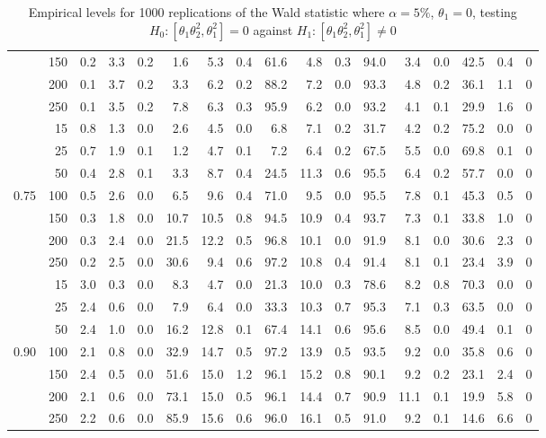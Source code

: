 \documentclass[]{article}\usepackage[]{graphicx}\usepackage[]{color}
\begin{document}
\begin{table}[H]
{\begin{tabular}{|r|r|r|r|r|r|r|r|r|r|r|r|r|r|r|r|r|}
			& 150 & 0.2 & 3.3 & 0.2 & 1.6 & 5.3 & 0.4 & 61.6 & 4.8 & 0.3 & 94.0 & 3.4 & 0.0 & 42.5 & 0.4 & 0 \\
			& 200 & 0.1 & 3.7 & 0.2 & 3.3 & 6.2 & 0.2 & 88.2 & 7.2 & 0.0 & 93.3 & 4.8 & 0.2 & 36.1 & 1.1 & 0 \\
			& 250 & 0.1 & 3.5 & 0.2 & 7.8 & 6.3 & 0.3 & 95.9 & 6.2 & 0.0 & 93.2 & 4.1 & 0.1 & 29.9 & 1.6 & 0 \\
			\hline
			& 15 & 0.8 & 1.3 & 0.0 & 2.6 & 4.5 & 0.0 & 6.8 & 7.1 & 0.2 & 31.7 & 4.2 & 0.2 & 75.2 & 0.0 & 0 \\
			& 25 & 0.7 & 1.9 & 0.1 & 1.2 & 4.7 & 0.1 & 7.2 & 6.4 & 0.2 & 67.5 & 5.5 & 0.0 & 69.8 & 0.1 & 0 \\
			& 50 & 0.4 & 2.8 & 0.1 & 3.3 & 8.7 & 0.4 & 24.5 & 11.3 & 0.6 & 95.5 & 6.4 & 0.2 & 57.7 & 0.0 & 0 \\
			0.75 & 100 & 0.5 & 2.6 & 0.0 & 6.5 & 9.6 & 0.4 & 71.0 & 9.5 & 0.0 & 95.5 & 7.8 & 0.1 & 45.3 & 0.5 & 0 \\
			& 150 & 0.3 & 1.8 & 0.0 & 10.7 & 10.5 & 0.8 & 94.5 & 10.9 & 0.4 & 93.7 & 7.3 & 0.1 & 33.8 & 1.0 & 0 \\
			& 200 & 0.3 & 2.4 & 0.0 & 21.5 & 12.2 & 0.5 & 96.8 & 10.1 & 0.0 & 91.9 & 8.1 & 0.0 & 30.6 & 2.3 & 0 \\
			& 250 & 0.2 & 2.5 & 0.0 & 30.6 & 9.4 & 0.6 & 97.2 & 10.8 & 0.4 & 91.4 & 8.1 & 0.1 & 23.4 & 3.9 & 0 \\
			\hline
			& 15 & 3.0 & 0.3 & 0.0 & 8.3 & 4.7 & 0.0 & 21.3 & 10.0 & 0.3 & 78.6 & 8.2 & 0.8 & 70.3 & 0.0 & 0 \\
			& 25 & 2.4 & 0.6 & 0.0 & 7.9 & 6.4 & 0.0 & 33.3 & 10.3 & 0.7 & 95.3 & 7.1 & 0.3 & 63.5 & 0.0 & 0 \\
			& 50 & 2.4 & 1.0 & 0.0 & 16.2 & 12.8 & 0.1 & 67.4 & 14.1 & 0.6 & 95.6 & 8.5 & 0.0 & 49.4 & 0.1 & 0 \\
			0.90 & 100 & 2.1 & 0.8 & 0.0 & 32.9 & 14.7 & 0.5 & 97.2 & 13.9 & 0.5 & 93.5 & 9.2 & 0.0 & 35.8 & 0.6 & 0 \\
			& 150 & 2.4 & 0.5 & 0.0 & 51.6 & 15.0 & 1.2 & 96.1 & 15.2 & 0.8 & 90.1 & 9.2 & 0.2 & 23.1 & 2.4 & 0 \\
			& 200 & 2.1 & 0.6 & 0.0 & 73.1 & 15.0 & 0.5 & 96.1 & 14.4 & 0.7 & 90.9 & 11.1 & 0.1 & 19.9 & 5.8 & 0 \\
			& 250 & 2.2 & 0.6 & 0.0 & 85.9 & 15.6 & 0.6 & 96.0 & 16.1 & 0.5 & 91.0 & 9.2 & 0.1 & 14.6 & 6.6 & 0 \\
			\hline
		\end{tabular}
	}
	\caption{Empirical levels for 1000 replications of the Wald statistic where $\alpha = 5\%$, $\theta_1=0$, testing $H_0: \left[ \theta_1\theta_2^2, \theta_1^2\right] =0$ against $H_1: \left[ \theta_1\theta_2^2, \theta_1^2\right] \neq 0$}
	\label{tbl:W:13}
\end{table}
\end{document}
